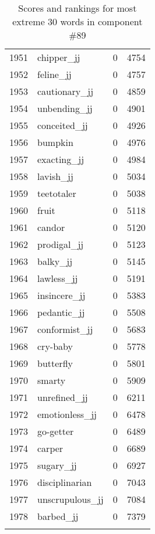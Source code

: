 \begin{longtable}[!htbp]{| rlr@{.}l |}
    1951 & chipper\_jj & 0 & 4754 \\
    1952 & feline\_jj & 0 & 4757 \\
    1953 & cautionary\_jj & 0 & 4859 \\
    1954 & unbending\_jj & 0 & 4901 \\
    1955 & conceited\_jj & 0 & 4926 \\
    1956 & bumpkin & 0 & 4976 \\
    1957 & exacting\_jj & 0 & 4984 \\
    1958 & lavish\_jj & 0 & 5034 \\
    1959 & teetotaler & 0 & 5038 \\
    1960 & fruit & 0 & 5118 \\
    1961 & candor & 0 & 5120 \\
    1962 & prodigal\_jj & 0 & 5123 \\
    1963 & balky\_jj & 0 & 5145 \\
    1964 & lawless\_jj & 0 & 5191 \\
    1965 & insincere\_jj & 0 & 5383 \\
    1966 & pedantic\_jj & 0 & 5508 \\
    1967 & conformist\_jj & 0 & 5683 \\
    1968 & cry-baby & 0 & 5778 \\
    1969 & butterfly & 0 & 5801 \\
    1970 & smarty & 0 & 5909 \\
    1971 & unrefined\_jj & 0 & 6211 \\
    1972 & emotionless\_jj & 0 & 6478 \\
    1973 & go-getter & 0 & 6489 \\
    1974 & carper & 0 & 6689 \\
    1975 & sugary\_jj & 0 & 6927 \\
    1976 & disciplinarian & 0 & 7043 \\
    1977 & unscrupulous\_jj & 0 & 7084 \\
    1978 & barbed\_jj & 0 & 7379 \\
    \hline
    \caption{Scores and rankings for most extreme 30 words in component \#89} \\
\end{longtable}
